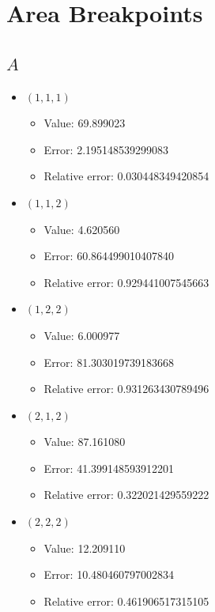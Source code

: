 \documentclass{article}%
\begin{document}
\section{Area Breakpoints}%
\thispagestyle{plain}%
\subsection{$A$}%
\begin{itemize}%
	\item $(1, 1, 1)$%
	\begin{itemize}%
		\item Value: 69.899023%
		\item Error: 2.195148539299083%
		\item Relative error: 0.030448349420854%
	\end{itemize}%
	\item $(1, 1, 2)$%
	\begin{itemize}%
		\item Value: 4.620560%
		\item Error: 60.864499010407840%
		\item Relative error: 0.929441007545663%
	\end{itemize}%
	\item $(1, 2, 2)$%
	\begin{itemize}%
		\item Value: 6.000977%
		\item Error: 81.303019739183668%
		\item Relative error: 0.931263430789496%
	\end{itemize}%
	\item $(2, 1, 2)$%
	\begin{itemize}%
		\item Value: 87.161080%
		\item Error: 41.399148593912201%
		\item Relative error: 0.322021429559222%
	\end{itemize}%
	\item $(2, 2, 2)$%
	\begin{itemize}%
		\item Value: 12.209110%
		\item Error: 10.480460797002834%
		\item Relative error: 0.461906517315105%
	\end{itemize}%
\end{itemize}%
\end{document}
